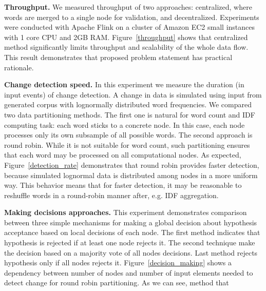 {\bf Throughput.} We measured throughput of two approaches: centralized, where words are merged to a single node for validation, and decentralized. Experiments were conducted with Apache Flink on a cluster of Amazon EC2 small instances with 1 core CPU and 2GB RAM. Figure~\ref{throughput} shows that centralized method significantly limits throughput and scalability of the whole data flow. This result demonstrates that proposed problem statement has practical rationale.

{\bf Change detection speed.} In this experiment we measure the duration (in input events) of change detection. A change in data is simulated using input from generated corpus with lognormally distributed word frequencies. We compared two data partitioning methods. The first one is natural for word count and IDF computing task: each word sticks to a concrete node. In this case, each node processes only its own subsample of all possible words. The second approach is round robin. While it is not suitable for word count, such partitioning ensures that each word may be processed on all computational nodes. As expected, Figure~\ref{detection_rate} demonstrates that round robin provides faster detection, because simulated lognormal data is distributed among nodes in a more uniform way. This behavior means that for faster detection, it may be reasonable to reshuffle words in a round-robin manner after, e.g. IDF aggregation.

{\bf Making decisions approaches.} This experiment demonstrates comparison between three simple mechanisms for making a global decision about hypothesis acceptance based on local decisions of each node. The first method indicates that hypothesis is rejected if at least one node rejects it. The second technique make the decision based on a majority vote of all nodes decisions. Last method rejects hypothesis only if all nodes rejects it. Figure~\ref{decision_making} shows a dependency between number of nodes and number of input elements needed to detect change for round robin partitioning. As we can see, method that   